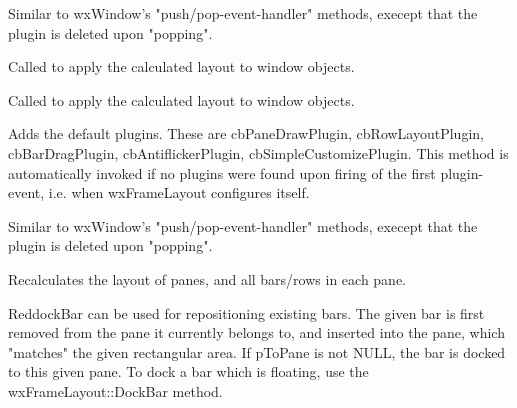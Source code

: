 
Similar to wxWindow's "push/pop-event-handler" methods, execept
that the plugin is deleted upon "popping".


\label{wxframelayoutpositionclientwindow}


Called to apply the calculated layout to window objects.


\label{wxframelayoutpositionpanes}


Called to apply the calculated layout to window objects.


\label{wxframelayoutpushdefaultplugins}


Adds the default plugins. These are cbPaneDrawPlugin, cbRowLayoutPlugin, cbBarDragPlugin,
cbAntiflickerPlugin, cbSimpleCustomizePlugin.
This method is automatically invoked if no plugins were found upon
firing of the first plugin-event, i.e. when wxFrameLayout configures itself.


\label{wxframelayoutpushplugin}


Similar to wxWindow's "push/pop-event-handler" methods, execept
that the plugin is deleted upon "popping".


\label{wxframelayoutrecalclayout}


Recalculates the layout of panes, and all bars/rows in each pane.


\label{wxframelayoutredockbar}


ReddockBar can be used for repositioning existing bars. The given bar is first removed
from the pane it currently belongs to, and inserted into the pane, which "matches"
the given rectangular area. If pToPane is not NULL, the bar is docked to this given pane.
To dock a bar which is floating, use the wxFrameLayout::DockBar method.


